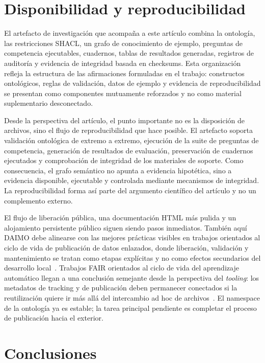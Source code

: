 \documentclass[11pt,a4paper]{article}
\begin{document}
\section{Disponibilidad y reproducibilidad}\label{sec:avail}

El artefacto de investigación que acompaña a este artículo combina la ontología, las restricciones SHACL, un grafo de conocimiento de ejemplo, preguntas de competencia ejecutables, cuadernos, tablas de resultados generadas, registros de auditoría y evidencia de integridad basada en checksums. Esta organización refleja la estructura de las afirmaciones formuladas en el trabajo: constructos ontológicos, reglas de validación, datos de ejemplo y evidencia de reproducibilidad se presentan como componentes mutuamente reforzados y no como material suplementario desconectado.

Desde la perspectiva del artículo, el punto importante no es la disposición de archivos, sino el flujo de reproducibilidad que hace posible. El artefacto soporta validación ontológica de extremo a extremo, ejecución de la suite de preguntas de competencia, generación de resultados de evaluación, preservación de cuadernos ejecutados y comprobación de integridad de los materiales de soporte. Como consecuencia, el grafo semántico no apunta a evidencia hipotética, sino a evidencia disponible, ejecutable y controlada mediante mecanismos de integridad. La reproducibilidad forma así parte del argumento científico del artículo y no un complemento externo.

El flujo de liberación pública, una documentación HTML más pulida y un alojamiento persistente público siguen siendo pasos inmediatos. También aquí DAIMO debe alinearse con las mejores prácticas visibles en trabajos orientados al ciclo de vida de publicación de datos enlazados, donde liberación, validación y mantenimiento se tratan como etapas explícitas y no como efectos secundarios del desarrollo local~\cite{penteado23}. Trabajos FAIR orientados al ciclo de vida del aprendizaje automático llegan a una conclusión semejante desde la perspectiva del \emph{tooling}: los metadatos de tracking y de publicación deben permanecer conectados si la reutilización quiere ir más allá del intercambio ad hoc de archivos~\cite{schmidt21}. El namespace de la ontología ya es estable; la tarea principal pendiente es completar el proceso de publicación hacia el exterior.

\section{Conclusiones}\label{sec:conclusion}
\end{document}
